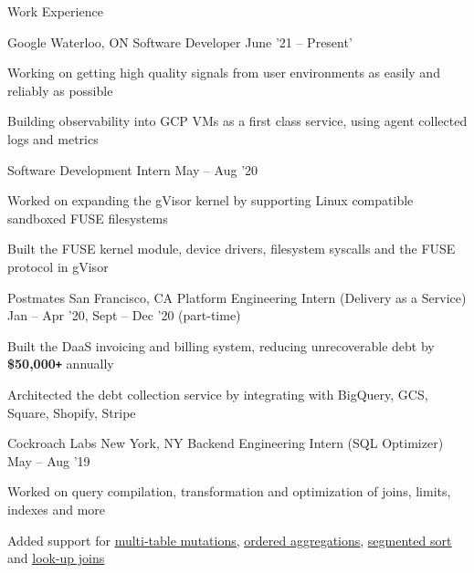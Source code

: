 \documentclass{resume} %
\begin{document}
\begin{rSection}{Work Experience}
  \begin{rDualWorkSection}{Google}
         {Waterloo, ON}
         {Software Developer}
         {June '21 -- Present'}
    {
    \item Working on getting high quality signals from user environments
      as easily and reliably as possible
    \item Building observability into GCP VMs as a first class service, using
      agent collected logs and metrics
    }
    {Software Development Intern}
    {May -- Aug '20}
    {
      \item Worked on expanding the gVisor kernel by supporting Linux
        compatible sandboxed FUSE filesystems 
      \item Built
        the FUSE kernel module, device drivers, filesystem syscalls and the FUSE protocol in gVisor
    }
  \end{rDualWorkSection}
  \begin{rWorkSection}{Postmates}
		     {San Francisco, CA}
		     {Platform Engineering Intern (Delivery as a Service)}
             {Jan -- Apr '20, Sept -- Dec '20 (part-time)}
    {
      \item Built the DaaS invoicing and
        billing system, reducing unrecoverable debt by \textbf{\$50,000\texttt{+}} annually
      \item Architected the debt collection service by integrating with
        BigQuery, GCS, Square, Shopify, Stripe
    }
  \end{rWorkSection}
  \begin{rDualWorkSection}{Cockroach Labs}
         {New York, NY}
         {Backend Engineering Intern (SQL Optimizer)}
         {May -- Aug '19}
    {
       \item Worked on query compilation, transformation and
         optimization of joins, limits, indexes and more
       \item Added support for  
         \href{https://github.com/cockroachdb/cockroach/pull/38452}{\ul{multi-table
           mutations}}, 
         \href{https://github.com/cockroachdb/cockroach/pull/38452}{\underline{ordered
           aggregations}}, 
         \href{https://github.com/cockroachdb/cockroach/pull/38452}{\underline{segmented
             sort}} and 
         \href{https://github.com/cockroachdb/cockroach/pull/38285}{\underline{look-up
           joins}}
}
\end{rDualWorkSection}
\end{rSection}
\end{document}
